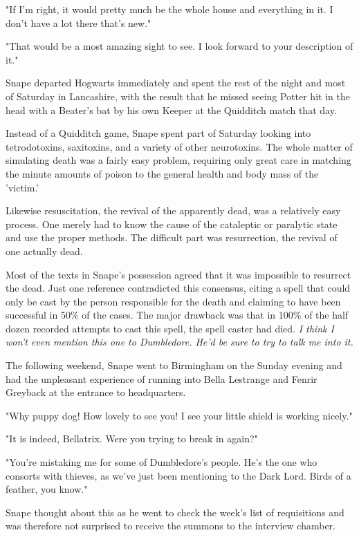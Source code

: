 \documentclass[a4paper,11pt]{article}
\begin{document}
"If I'm right, it would pretty much be the whole house and everything in it. I don't have a lot there that's new."

"That would be a most amazing sight to see. I look forward to your description of it."

Snape departed Hogwarts immediately and spent the rest of the night and most of Saturday in Lancashire, with the result that he missed seeing Potter hit in the head with a Beater's bat by his own Keeper at the Quidditch match that day.

Instead of a Quidditch game, Snape spent part of Saturday looking into tetrodotoxins, saxitoxins, and a variety of other neurotoxins. The whole matter of simulating death was a fairly easy problem, requiring only great care in matching the minute amounts of poison to the general health and body mass of the 'victim.'

Likewise resuscitation, the revival of the apparently dead, was a relatively easy process. One merely had to know the cause of the cataleptic or paralytic state and use the proper methods. The difficult part was resurrection, the revival of one actually dead.

Most of the texts in Snape's possession agreed that it was impossible to resurrect the dead. Just one reference contradicted this consensus, citing a spell that could only be cast by the person responsible for the death and claiming to have been successful in 50\% of the cases. The major drawback was that in 100\% of the half dozen recorded attempts to cast this spell, the spell caster had died. \emph{I think I won't even mention this one to Dumbledore. He'd be sure to try to talk me into it.}

The following weekend, Snape went to Birmingham on the Sunday evening and had the unpleasant experience of running into Bella Lestrange and Fenrir Greyback at the entrance to headquarters.

"Why puppy dog! How lovely to see you! I see your little shield is working nicely."

"It is indeed, Bellatrix. Were you trying to break in again?"

"You're mistaking me for some of Dumbledore's people. He's the one who consorts with thieves, as we've just been mentioning to the Dark Lord. Birds of a feather, you know."

Snape thought about this as he went to check the week's list of requisitions and was therefore not surprised to receive the summons to the interview chamber.
\end{document}
